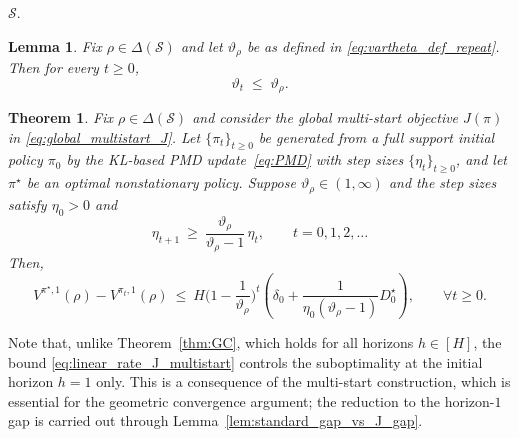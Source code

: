 \documentclass[11pt]{article}
\newtheorem{thm}{Theorem}
\newtheorem{lem}{Lemma}
\begin{document}
$\mathcal S$.
\begin{lem}
\label{lem:vartheta_t_le_vartheta_rho}
Fix $\rho\in\Delta(\mathcal S)$ and let $\vartheta_\rho$ be as defined in \eqref{eq:vartheta_def_repeat}. Then for every $t\ge 0$,
\begin{equation}
\label{eq:vartheta_t_le_vartheta_rho}
\vartheta_t \;\le\; \vartheta_\rho.
\end{equation}
\end{lem}
\begin{thm}
\label{thm:geo_multistart}
Fix $\rho\in\Delta(\mathcal S)$ and consider the global multi-start objective
$J(\pi)$ in \eqref{eq:global_multistart_J}. Let $\{\pi_t\}_{t\ge0}$ be generated from a full support initial policy
$\pi_0$ by the KL-based PMD update~\eqref{eq:PMD} with step sizes
$\{\eta_t\}_{t\ge 0}$, and let $\pi^\star$ be an optimal nonstationary policy.
Suppose $\vartheta_\rho\in(1,\infty)$ and the step sizes satisfy $\eta_0>0$
and
\begin{equation}
\label{eq:eta_growth_thm}
\eta_{t+1}\ \ge\ \frac{\vartheta_\rho}{\vartheta_\rho-1}\,\eta_t,
\qquad t=0,1,2,\dots
\end{equation}
Then,
\begin{equation}
\label{eq:linear_rate_J_multistart}
V^{\pi^\star,1}(\rho)-V^{\pi_t,1}(\rho)
\ \le\
H\Big(1-\frac{1}{\vartheta_\rho}\Big)^t
\left(
\delta_0+\frac{1}{\eta_0(\vartheta_\rho-1)}D_0^\star
\right),
\qquad \forall t\ge 0.
\end{equation}
\end{thm}
Note that, unlike Theorem~\ref{thm:GC}, which holds for all horizons
$h\in[H]$, the bound \eqref{eq:linear_rate_J_multistart} controls the
suboptimality at the initial horizon $h=1$ only. This is a consequence of the
multi-start construction, which is essential for the geometric convergence
argument; the reduction to the horizon-$1$ gap is carried out through
Lemma~\ref{lem:standard_gap_vs_J_gap}.
\end{document}
